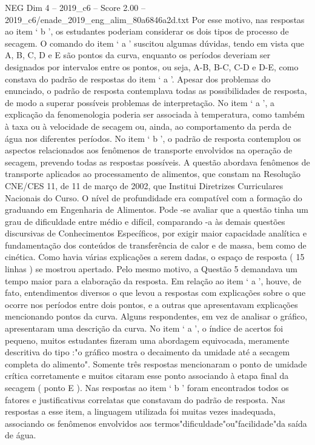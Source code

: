 \begin{textsample}{NEG Dim 4 – 2019\_c6 – Score 2.00 – 2019\_c6/enade\_2019\_eng\_alim\_80a6846a2d.txt}
Por esse motivo, nas respostas ao item ‘ b ’, os estudantes poderiam considerar os dois tipos de processo de secagem.
O comando do item ‘ a ’ suscitou algumas dúvidas, tendo em vista que A, B, C, D e E são pontos da curva, enquanto os períodos deveriam ser designados por intervalos entre os pontos, ou seja, A-B, B-C, C-D e D-E, como constava do padrão de respostas do item ‘ a ’.
Apesar dos problemas do enunciado, o padrão de resposta contemplava todas as possibilidades de resposta, de modo a superar possíveis problemas de interpretação.
No item ‘ a ’, a explicação da fenomenologia poderia ser associada à temperatura, como também à taxa ou à velocidade de secagem ou, ainda, ao comportamento da perda de água nos diferentes períodos.
No item ‘ b ’, o padrão de resposta contemplou os aspectos relacionados aos fenômenos de transporte envolvidos na operação de secagem, prevendo todas as respostas possíveis.
A questão abordava fenômenos de transporte aplicados ao processamento de alimentos, que constam na Resolução CNE/CES 11, de 11 de março de 2002, que Institui Diretrizes Curriculares Nacionais do Curso.
O nível de profundidade era compatível com a formação do graduando em Engenharia de Alimentos.
Pode -se avaliar que a questão tinha um grau de dificuldade entre médio e difícil, comparando -a às demais questões discursivas de Conhecimentos Específicos, por exigir maior capacidade analítica e fundamentação dos conteúdos de transferência de calor e de massa, bem como de cinética.
Como havia várias explicações a serem dadas, o espaço de resposta ( 15 linhas ) se mostrou apertado.
Pelo mesmo motivo, a Questão 5 demandava um tempo maior para a elaboração da resposta.
Em relação ao item ‘ a ’, houve, de fato, entendimentos diversos o que levou a respostas com explicações sobre o que ocorre nos períodos entre dois pontos, e a outras que apresentavam explicações mencionando pontos da curva.
Alguns respondentes, em vez de analisar o gráfico, apresentaram uma descrição da curva.
No item ‘ a ’, o índice de acertos foi pequeno, muitos estudantes fizeram uma abordagem equivocada, meramente descritiva do tipo :"o gráfico mostra o decaimento da umidade até a secagem completa do alimento".
Somente três respostas mencionaram o ponto de umidade crítica corretamente e muitos citaram esse ponto associando à etapa final da secagem ( ponto E ).
Nas respostas ao item ‘ b ’ foram encontrados todos os fatores e justificativas correlatas que constavam do padrão de resposta.
Nas respostas a esse item, a linguagem utilizada foi muitas vezes inadequada, associando os fenômenos envolvidos aos termos"dificuldade"ou"facilidade"da saída de água.

\end{textsample}
